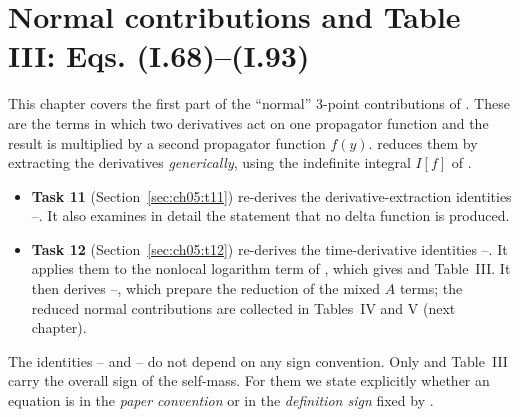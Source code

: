 \providecommand{\chVdd}{\nabla\!\cdot\!\nabla'}          %
\providecommand{\chVlead}{A_{\rm lead}}                  %
\providecommand{\chVAh}{\hat A}                          %
\providecommand{\chVyes}{\textcolor{tagD}{agrees}}
\providecommand{\chVno}{\textcolor{tagC}{differs}}

\chapter{Normal contributions and Table III: Eqs. (I.68)--(I.93)}
\label{ch:05}
\hypersetup{hypertexnames=false}

This chapter covers the first part of the ``normal'' 3-point contributions of \PI. These are the terms
 in which two derivatives act on one propagator function and the result is multiplied by a second
propagator function $f(y)$. \PI{} reduces them by extracting the derivatives \emph{generically}, using the
indefinite integral $I[f]$ of .
\begin{itemize}[leftmargin=14pt]
\item \textbf{Task 11} (Section~\ref{sec:ch05:t11}) re-derives the derivative-extraction identities --.
It also examines in detail the statement  that no delta function is produced.
\item \textbf{Task 12} (Section~\ref{sec:ch05:t12}) re-derives the time-derivative identities --.
It applies them to the nonlocal logarithm term of , which gives  and Table~III.
It then derives --, which prepare the reduction of the mixed $A$ terms; the reduced normal contributions are collected in Tables~IV and V (next chapter).
\end{itemize}
The identities -- and -- do not depend on any sign convention.
Only  and Table~III carry the overall sign of the self-mass. For them we state explicitly whether an equation
is in the \emph{paper convention} or in the \emph{definition sign} fixed by .

